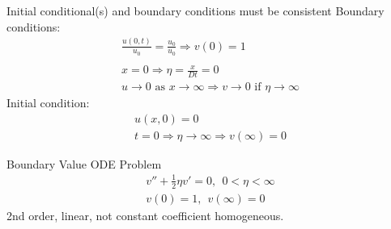 \documentclass[
	date={September 4{,} 2024}
]{math486notes}
\begin{document}
Initial conditional(s) and boundary conditions must be consistent
Boundary conditions:
\begin{equation*}
\begin{aligned}
	\frac{u(0, t)}{u_{0}} = \frac{u_{0}}{u_{0}} \Rightarrow v(0) = 1\\\\
	x = 0 \Rightarrow \eta = \frac{x}{Dt} = 0\\
	u \rightarrow 0 \mbox{ as } x \rightarrow \infty \Rightarrow v \rightarrow 0 \mbox{ if } \eta \rightarrow \infty
\end{aligned}
\end{equation*}
Initial condition:
\begin{equation*}
\begin{aligned}
	u(x, 0) = 0\\
	t = 0 \Rightarrow \eta \rightarrow \infty \Rightarrow v(\infty) = 0
\end{aligned}
\end{equation*}

\vspace{1em}
\begin{center}
	Boundary Value ODE Problem
	\begin{equation*}
	\begin{aligned}
		v'' + \frac{1}{2}\eta v' = 0,\ \ 0 < \eta < \infty\\
		v(0) = 1,\ \ v(\infty) = 0
	\end{aligned}
	\end{equation*}
	2nd order, linear, not constant coefficient homogeneous.
\end{center}
\end{document}
